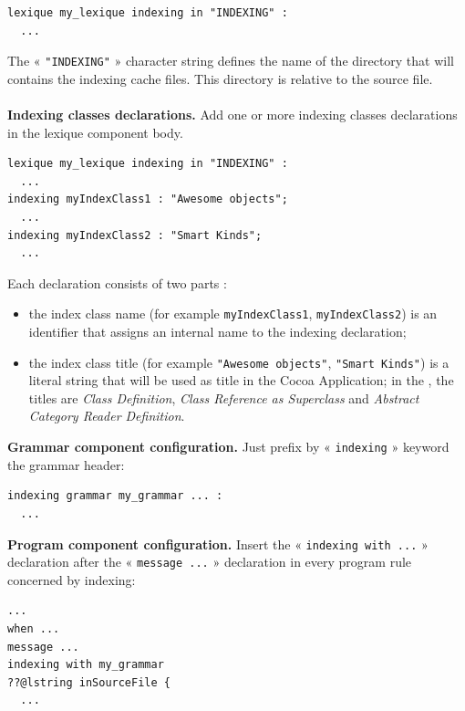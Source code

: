 \begin{lstlisting}[language=galgas]
lexique my_lexique indexing in "INDEXING" :
  ...
\end{lstlisting}

The « \texttt{"INDEXING"} » character string defines the name of the directory that will contains the indexing cache files. This directory is relative to the source file.
 \\
 \\
 \textbf{Indexing classes declarations.} Add one or more indexing classes declarations in the lexique component body.


\begin{lstlisting}[language=galgas]
lexique my_lexique indexing in "INDEXING" :
  ...
indexing myIndexClass1 : "Awesome objects";
  ...
indexing myIndexClass2 : "Smart Kinds";
  ...
\end{lstlisting}

Each declaration consists of two parts :
\begin{itemize}
\item the index class name (for example \texttt{myIndexClass1}, \texttt{myIndexClass2}) is an identifier that assigns an internal name to the indexing declaration;
\item the index class title (for example \texttt{"Awesome objects"}, \texttt{"Smart Kinds"}) is a literal string that will be used as title in the Cocoa Application; in the , the titles are \emph{Class Definition}, \emph{Class Reference as Superclass} and \emph{Abstract Category Reader Definition}.
\end{itemize}

\noindent{} \textbf{Grammar component configuration.} Just prefix by « \texttt{indexing} » keyword the grammar header:

\begin{lstlisting}[language=galgas]
indexing grammar my_grammar ... :
  ...
\end{lstlisting}



\noindent{} \textbf{Program component configuration.} Insert the « \texttt{indexing with ...} » declaration after the « \texttt{message ...} » declaration in every program rule concerned by indexing:

\begin{lstlisting}[language=galgas]
  ...
when ...
message ...
indexing with my_grammar
??@lstring inSourceFile {
  ...
\end{lstlisting}






